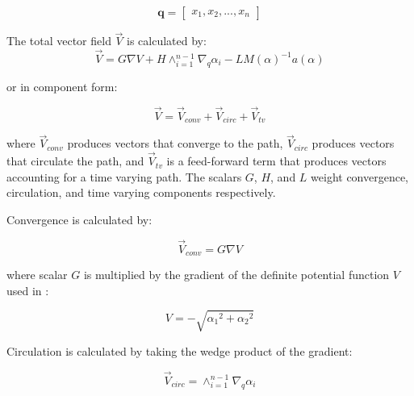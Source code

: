 \documentclass[numbered,pdftex]{ohio-etd}
\begin{document}


\begin{equation}
\mathbf{q} = \begin{bmatrix} x_1, x_2, ..., x_{n}\end{bmatrix}
\end{equation}

\noindent
The total vector field $\overrightarrow{V}$ is calculated by:
\begin{equation}\label{eq:GVF}
\overrightarrow{V} = G \nabla V + H \wedge_{i=1}^{n-1}\nabla_q\alpha_i  - LM(\alpha)^{-1} a(\alpha)
\end{equation}

\noindent
or in component form:

\begin{equation}\label{simpleGVF}
\overrightarrow{V} = \overrightarrow{V}_{conv} + \overrightarrow{V}_{circ} + \overrightarrow{V}_{tv} 
\end{equation}	

\noindent
where $\overrightarrow{V}_{conv}$ produces vectors that converge to the path, $\overrightarrow{V}_{circ}$ produces vectors that circulate the path, and $\overrightarrow{V}_{tv}$ is a feed-forward term that produces vectors accounting for a time varying path. The scalars $G$, $H$, and $L$ weight convergence, circulation, and time varying components respectively. 

\noindent
Convergence is calculated by:

\begin{equation}
\overrightarrow{V}_{conv} = G \nabla V  
\label{convOnly}
\end{equation}

\noindent
where scalar $G$ is multiplied by the gradient of the definite potential function $V$ used in \cite{goncalves_circulation_2010}:

\begin{equation}
\label{potentialV}
V = -\sqrt{{\alpha_1}^2 + {\alpha_2}^2}
\end{equation}


\noindent
Circulation is calculated by taking the wedge product of the gradient:

\begin{equation}
\overrightarrow{V}_{circ} =  \wedge_{i=1}^{n-1}\nabla_q\alpha_i 
\label{circOnly}
\end{equation}
\end{document}
